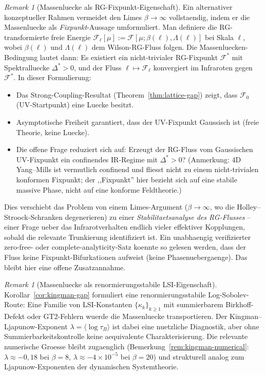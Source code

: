 \documentclass[12pt,a4paper]{article}
\theoremstyle{definition}
\theoremstyle{plain}
\theoremstyle{remark}
\newtheorem{remark}[definition]{Remark}
\begin{document}
\begin{remark}[Massenluecke als RG-Fixpunkt-Eigenschaft]\label{rem:rg-fixpoint}
Ein alternativer konzeptueller Rahmen vermeidet den Limes $\beta \to \infty$
vollstaendig, indem er die Massenluecke als \emph{Fixpunkt}-Aussage
umformuliert. Man definiere die RG-transformierte freie Energie
$\mathcal{F}_\ell[\mu] := \mathcal{F}[\mu; \beta(\ell), \Lambda(\ell)]$
bei Skala $\ell$, wobei $\beta(\ell)$ und $\Lambda(\ell)$ dem
Wilson-RG-Fluss folgen. Die Massenluecken-Bedingung lautet dann: Es
existiert ein nicht-trivialer RG-Fixpunkt $\mathcal{F}^*$ mit
Spektralluecke $\Delta^* > 0$, und der Fluss $\ell \mapsto
\mathcal{F}_\ell$ konvergiert im Infraroten gegen $\mathcal{F}^*$.
In dieser Formulierung:
\begin{itemize}
  \item Das Strong-Coupling-Resultat (Theorem~\ref{thm:lattice-gap}) zeigt,
    dass $\mathcal{F}_0$ (UV-Startpunkt) eine Luecke besitzt.
  \item Asymptotische Freiheit garantiert, dass der UV-Fixpunkt Gaussisch
    ist (freie Theorie, keine Luecke).
  \item Die offene Frage reduziert sich auf: Erzeugt der RG-Fluss vom
    Gaussischen UV-Fixpunkt ein confinendes IR-Regime mit
    $\Delta^* > 0$?
    (Anmerkung: 4D Yang--Mills ist vermutlich confinend und fliesst nicht zu einem nicht-trivialen konformen Fixpunkt; der ,,Fixpunkt'' hier bezieht sich auf eine stabile massive Phase, nicht auf eine konforme Feldtheorie.)
\end{itemize}
Dies verschiebt das Problem von einem Limes-Argument ($\beta \to \infty$,
wo die Holley--Stroock-Schranken degenerieren) zu einer
\emph{Stabilitaetsanalyse des RG-Flusses} -- einer Frage ueber das
Infrarotverhalten endlich vieler effektiver Kopplungen, sobald die
relevante Trunkierung identifiziert ist. Ein unabhaengig verifizierter
zero-free- oder complete-analyticity-Satz koennte so gelesen werden, dass
der Fluss keine Fixpunkt-Bifurkationen aufweist (keine
Phasenuebergaenge). Das bleibt hier eine offene Zusatzannahme.
\end{remark}

\begin{remark}[Massenluecke als renormierungsstabile LSI-Eigenschaft]\label{rem:lsi-equivalence}
Korollar~\ref{cor:kingman-gap} formuliert eine renormierungsstabile
Log-Sobolev-Route: Eine Familie von LSI-Konstanten $\{\kappa_k\}_{k \geq 1}$
mit summierbarem Birkhoff-Defekt oder GT2-Fehlern wuerde die Massenluecke
transportieren. Der Kingman--Ljapunow-Exponent
$\lambda = \langle\log\tau_B\rangle$ ist dabei eine nuetzliche Diagnostik,
aber ohne Summierbarkeitskontrolle keine aequivalente Charakterisierung.
Die relevante numerische Groesse bleibt zugaenglich
(Bemerkung~\ref{rem:kingman-numerical}: $\lambda \approx -0{,}18$ bei $\beta=8$,
$\lambda \approx -4 \times 10^{-5}$ bei $\beta=20$)
und strukturell analog zum Ljapunow-Exponenten der dynamischen Systemtheorie.
\end{remark}
\end{document}
